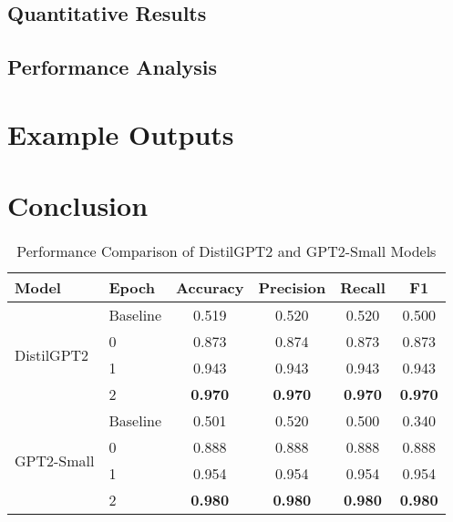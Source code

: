 \documentclass[11pt]{article}
\begin{document}
\subsection{Quantitative Results}

\subsection{Performance Analysis}

\section{Example Outputs}

\section{Conclusion}





\begin{table}[htbp]
\centering
\caption{Performance Comparison of DistilGPT2 and GPT2-Small Models}
\label{tab:model-comparison}
\begin{tabular}{llcccc}
\toprule
\textbf{Model} & \textbf{Epoch} & \textbf{Accuracy} & \textbf{Precision} & \textbf{Recall} & \textbf{F1} \\
\midrule
\multirow{4}{*}{DistilGPT2} & Baseline & 0.519 & 0.520 & 0.520 & 0.500 \\
 & 0 & 0.873 & 0.874 & 0.873 & 0.873 \\
 & 1 & 0.943 & 0.943 & 0.943 & 0.943 \\
 & 2 & \textbf{0.970} & \textbf{0.970} & \textbf{0.970} & \textbf{0.970} \\
\midrule
\multirow{4}{*}{GPT2-Small} & Baseline & 0.501 & 0.520 & 0.500 & 0.340 \\
 & 0 & 0.888 & 0.888 & 0.888 & 0.888 \\
 & 1 & 0.954 & 0.954 & 0.954 & 0.954 \\
 & 2 & \textbf{0.980} & \textbf{0.980} & \textbf{0.980} & \textbf{0.980} \\
\bottomrule
\end{tabular}
\end{table}
\end{document}

